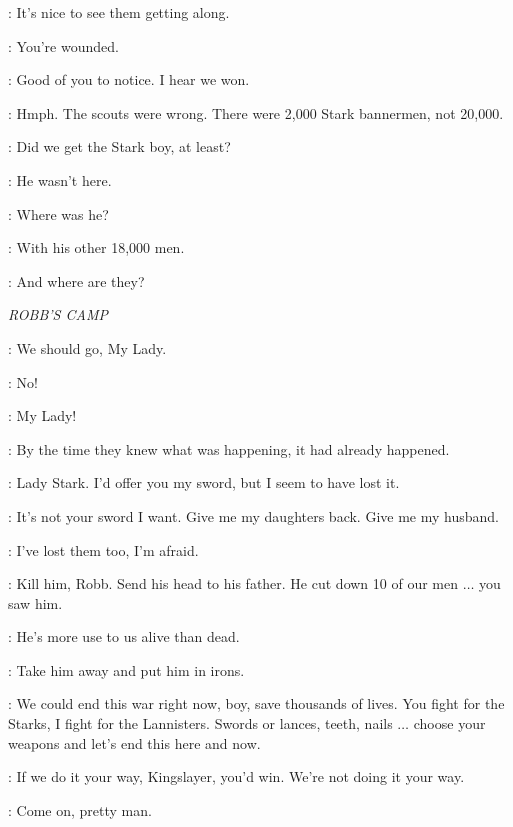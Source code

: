 \TYRION: It's nice to see them getting along. 


\TYWIN: You're wounded. 

\TYRION: Good of you to notice. I hear we won. 

\TYWIN: Hmph. The scouts were wrong. There were 2,000 Stark bannermen, not 20,000. 

\TYRION: Did we get the Stark boy, at least? 

\TYWIN: He wasn't here. 

\TYRION: Where was he? 

\TYWIN: With his other 18,000 men. 

\TYRION: And where are they? 


\scene

\textit{ROBB'S CAMP} 


\RODRIK: We should go, My Lady. 

\CATELYN: No! 

\RODRIK: My Lady! 


\ROBB: By the time they knew what was happening, it had already happened. 

\JAIME: Lady Stark. I'd offer you my sword, but I seem to have lost it. 

\CATELYN: It's not your sword I want. Give me my daughters back. Give me my husband. 

\JAIME: I've lost them too, I'm afraid. 

\THEON: Kill him, Robb. Send his head to his father. He cut down 10 of our men $\ldots$ you saw him. 

\ROBB: He's more use to us alive than dead. 

\CATELYN: Take him away and put him in irons. 

\JAIME: We could end this war right now, boy, save thousands of lives. You fight for the Starks, I fight for the Lannisters. Swords or lances, teeth, nails $\ldots$ choose your weapons and let's end this here and now. 

\ROBB: If we do it your way, Kingslayer, you'd win. We're not doing it your way. 

\UMBER: Come on, pretty man. 


